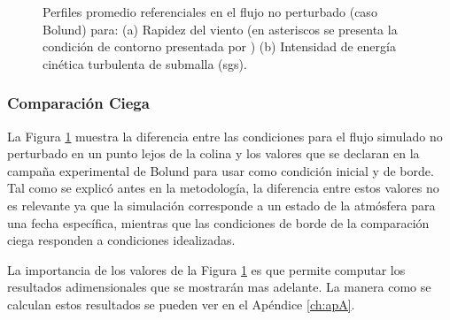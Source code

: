\begin{figure}[H]
\begin{minipage}{0.5\linewidth}
	\end{minipage}%
	\caption{Perfiles promedio referenciales en el flujo no perturbado (caso Bolund) para: (a) Rapidez del viento (en asteriscos se presenta la condición de contorno presentada por \cite{Bechmann2011}) (b) Intensidad de energía cinética turbulenta de submalla (sgs).}
	\label{fig:06_bol_referencia}
\end{figure}
\subsubsection{Comparación Ciega}
La Figura \ref{fig:06_bol_referencia} muestra la diferencia entre las condiciones para el flujo simulado no perturbado en un punto lejos de la colina y los valores que se declaran en la campaña experimental de Bolund para usar como condición inicial y de borde. Tal como se explicó antes en la metodología, la diferencia entre estos valores no es relevante ya que la simulación corresponde a un estado de la atmósfera para una fecha específica, mientras que las condiciones de borde de la comparación ciega responden a condiciones idealizadas. 

La importancia de los valores de la Figura \ref{fig:06_bol_referencia} es que permite computar los resultados adimensionales que se mostrarán mas adelante. La manera como se calculan estos resultados se pueden ver en el Apéndice \ref{ch:apA}.

